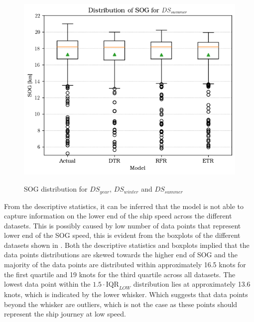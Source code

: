 \begin{figure}[ht]
\begin{minipage}[b]{0.32\textwidth}
    \label{fig:boxplot_dswinter}
\end{minipage}%
\hfill
\begin{minipage}[b]{0.32\textwidth}
    \centering
    \includegraphics[width=\textwidth]{02_figures/sog_pred_summer.png}
    \label{fig:boxplot_dssummer}
\end{minipage}

\caption{SOG distribution for $DS_{year}$, $DS_{winter}$ and $DS_{summer}$}
\label{fig:boxplot_sogPred_overall}
\end{figure}  

From the descriptive statistics, it can be inferred that the model is not able to capture information on the lower end of the ship speed across the different datasets. This is possibly caused by low number of data points that represent lower end of the SOG speed, this is evident from the boxplots of the different datasets shown in . Both the descriptive statistics and boxplots implied that the data points distributions are skewed towards the higher end of SOG and the majority of the data points are distributed within approximately 16.5 knots for the first quartile and 19 knots for the third quartile across all datasets. The lowest data point within the $1.5 \cdot \text{IQR}_{LOW}$ distribution lies at approximately 13.6 knots, which is indicated by the lower whisker. Which suggests that data points beyond the whisker are outliers, which is not the case as these points should represent the ship journey at low speed.\\ 

